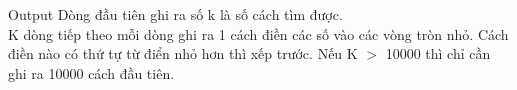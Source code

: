 Output
Dòng đầu tiên ghi ra số k là số cách tìm được.   
\\   K dòng tiếp theo mỗi dòng ghi ra 1 cách điền các số vào các vòng tròn nhỏ. Cách điền nào có thứ tự từ điển nhỏ hơn thì xếp trước. Nếu K $>$ 10000 thì chỉ cần ghi ra 10000 cách đầu tiên.